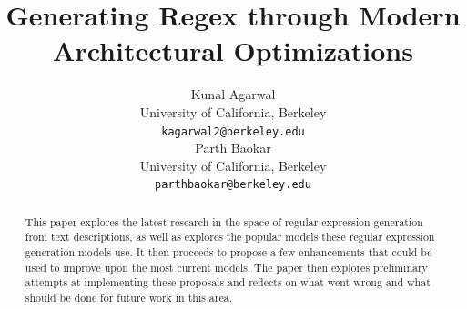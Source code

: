 \documentclass[11pt,a4paper]{article}
\title{Generating Regex through Modern Architectural Optimizations}
\author{Kunal Agarwal \\
  University of California, Berkeley \\
  \texttt{kagarwal2@berkeley.edu} \\\And
  Parth Baokar \\
  University of California, Berkeley \\
  \texttt{parthbaokar@berkeley.edu} \\}
\date{}
\begin{document}
\maketitle
\begin{abstract}
This paper explores the latest research in the space of regular expression generation from text descriptions, as well as explores the popular models these regular expression generation models use. It then proceeds to propose a few enhancements that could be used to improve upon the most current models. The paper then explores preliminary attempts at implementing these proposals and reflects on what went wrong and what should be done for future work in this area.
\end{abstract}


\end{document}
